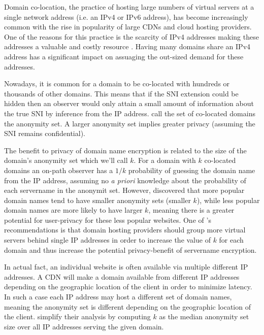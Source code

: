 Domain co-location, the practice of hosting large numbers of virtual servers at a single network address (i.e. an IPv4 or IPv6 address), has become increasingly common with the rise in popularity of large \acp{CDN} and cloud hosting providers. One of the reasons for this practice is the scarcity of IPv4 addresses making these addresses a valuable and costly resource \citep{mueller2008scarcity}. Having many domains share an IPv4 address has a significant impact on assuaging the out-sized demand for these addresses.


Nowadays, it is common for a domain to be co-located with hundreds or thousands of other domains.
This means that if the \ac{SNI} extension could be hidden then an observer would only attain a small amount of information about the true \ac{SNI} by inference from the \ac{IP} address.
\cite{esni} call the set of co-located domains the anonymity set.
A larger anonymity set implies greater privacy (assuming the \ac{SNI} remains confidential).

The benefit to privacy of domain name encryption is related to the size of the domain's anonymity set which we'll call $k$. For a domain with $k$ co-located domains an on-path observer has a $1/k$ probability of guessing the domain name from the \ac{IP} address,
assuming no {\em a priori} knowledge about the probability of each servername in the anonymit set.
However, \cite{hoang-2020-assessing-privacy-benefits-sni-encryption} discovered that more popular domain names tend to have smaller anonymity sets (smaller $k$), while less popular domain names are more likely to have larger $k$, meaning there is a greater potential for user-privacy for these less popular websites.
One of \citeauthor{hoang-2020-assessing-privacy-benefits-sni-encryption}'s \citeyear{hoang-2020-assessing-privacy-benefits-sni-encryption} recommendations is that domain hosting providers should group more virtual servers behind single \ac{IP} addresses in order to increase the value of $k$ for each domain and thus increase the potential privacy-benefit of servername encryption.

In actual fact, an individual website is often available via multiple different \ac{IP} addresses. A \ac{CDN} will make a domain available from different \ac{IP} addresses depending on the geographic location of the client in order to minimize latency. In such a case each \ac{IP} address may host a different set of domain names, meaning the anonymity set is different depending on the geographic location of the client. \cite{hoang-2020-assessing-privacy-benefits-sni-encryption} simplify their analysis by computing $k$ as the median anonymity set size over all \ac{IP} addresses serving the given domain.

